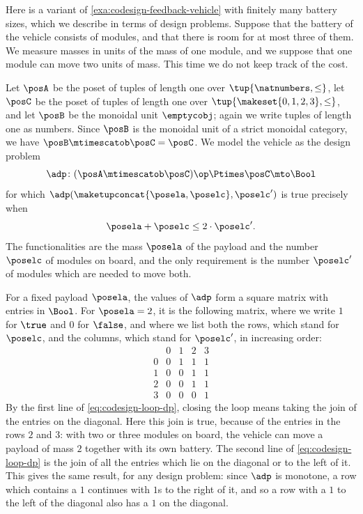 \begin{example}
    \label{exa:codesign-feedback-modules}
    Here is a variant of \cref{exa:codesign-feedback-vehicle} with finitely many battery sizes, which we describe in terms of design problems.
    Suppose that the battery of the vehicle consists of modules, and that there is room for at most three of them.
    We measure masses in units of the mass of one module, and we suppose that one module can move two units of mass.
    This time we do not keep track of the cost.

    Let $\posA$ be the poset of tuples of length one over $\tup{\natnumbers, \leq}$, let $\posC$ be the poset of tuples of length one over $\tup{\makeset{0, 1, 2, 3}, \leq}$, and let $\posB$ be the monoidal unit $\emptycobj$; again we write tuples of length one as numbers.
    Since $\posB$ is the monoidal unit of a strict monoidal category, we have $\posB \mtimescatob \posC = \posC$.
    We model the vehicle as the design problem
    \begin{equation}
        \adp \colon (\posA \mtimescatob \posC)\op \Ptimes \posC \mto \Bool
    \end{equation}
    for which $\adp(\maketupconcat{\posela, \poselc}, \poselc')$ is true precisely when
    \begin{equation}
        \posela + \poselc \leq 2 \cdot \poselc'.
    \end{equation}
    The functionalities are the mass $\posela$ of the payload and the number $\poselc$ of modules on board, and the only requirement is the number $\poselc'$ of modules which are needed to move both.

    For a fixed payload $\posela$, the values of $\adp$ form a square matrix with entries in $\Bool$.
    For $\posela = 2$, it is the following matrix, where we write $1$ for $\true$ and $0$ for $\false$, and where we list both the rows, which stand for $\poselc$, and the columns, which stand for $\poselc'$, in increasing order:
    \begin{equation}
        \label{eq:codesign-modules-matrix}
        \begin{array}{c|cccc}
              & 0 & 1 & 2 & 3 \\ \hline
            0 & 0 & 1 & 1 & 1 \\
            1 & 0 & 0 & 1 & 1 \\
            2 & 0 & 0 & 1 & 1 \\
            3 & 0 & 0 & 0 & 1
        \end{array}
    \end{equation}
    By the first line of \cref{eq:codesign-loop-dp}, closing the loop means taking the join of the entries on the diagonal.
    Here this join is true, because of the entries in the rows $2$ and $3$: with two or three modules on board, the vehicle can move a payload of mass $2$ together with its own battery.
    The second line of \cref{eq:codesign-loop-dp} is the join of all the entries which lie on the diagonal or to the left of it.
    This gives the same result, for any design problem: since $\adp$ is monotone, a row which contains a $1$ continues with $1$s to the right of it, and so a row with a $1$ to the left of the diagonal also has a $1$ on the diagonal.


\end{example}
